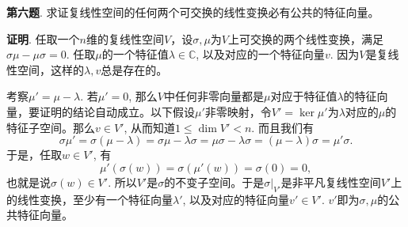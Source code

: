 \newpageorvspace


{\bf 第六题}. 求证复线性空间的任何两个可交换的线性变换必有公共的特征向量。

{\bf 证明}. 任取一个$n$维的复线性空间$V$，设$\sigma, \mu$为$V$上可交换的两个线性变换，满足$\sigma\mu - \mu\sigma = 0$. 任取$\mu$的一个特征值$\lambda \in \mathbb{C}$, 以及对应的一个特征向量$v$. 因为$V$是复线性空间，这样的$\lambda, v$总是存在的。

考察$\mu' = \mu - \lambda$. 若$\mu' = 0$, 那么$V$中任何非零向量都是$\mu$对应于特征值$\lambda$的特征向量，要证明的结论自动成立。以下假设$\mu'$非零映射，令$V' = \ker\mu'$为$\lambda$对应的$\mu$的特征子空间。那么$v\in V'$, 从而知道$1 \leqslant \dim V' < n$. 而且我们有
$$\sigma\mu' = \sigma(\mu-\lambda) = \sigma\mu - \lambda\sigma = 
\mu\sigma - \lambda\sigma = (\mu-\lambda)\sigma = \mu'\sigma.$$
于是，任取$w\in V'$, 有
$$\mu'(\sigma(w)) = \sigma(\mu'(w)) = \sigma(0) = 0,$$
也就是说$\sigma(w) \in V'$. 所以$V'$是$\sigma$的不变子空间。于是$\sigma|_{V'}$是非平凡复线性空间$V'$上的线性变换，至少有一个特征向量$\lambda'$, 以及对应的特征向量$v'\in V'$. $v'$即为$\sigma, \mu$的公共特征向量。



